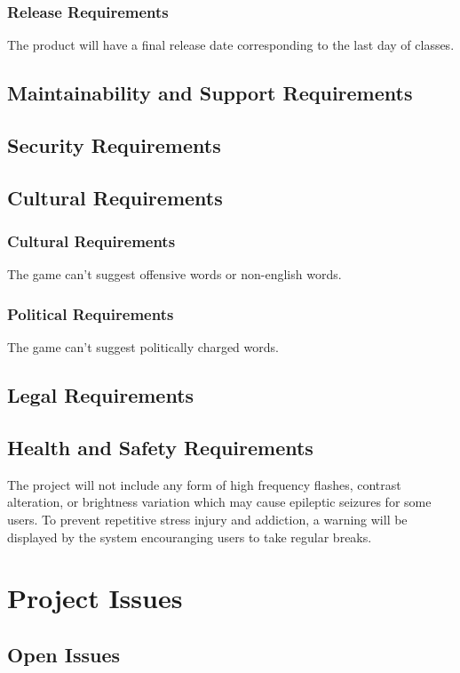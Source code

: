 \documentclass[12pt, titlepage]{article}
\begin{document}
\subsubsection{Release Requirements}
The product will have a final release date corresponding to the last day of classes.
\subsection{Maintainability and Support Requirements}

\subsection{Security Requirements}

\subsection{Cultural Requirements}
\subsubsection{Cultural Requirements}
The game can't suggest offensive words or non-english words.

\subsubsection{Political Requirements}
The game can't suggest politically charged words.

\subsection{Legal Requirements}

\subsection{Health and Safety Requirements}
The project will not include any form of high frequency flashes, contrast 
alteration, or brightness variation which may cause epileptic seizures for some 
users. To prevent repetitive stress injury and addiction, a warning will be 
displayed by the system encouranging users to take regular breaks.
\section{Project Issues}

\subsection{Open Issues}
\end{document}
